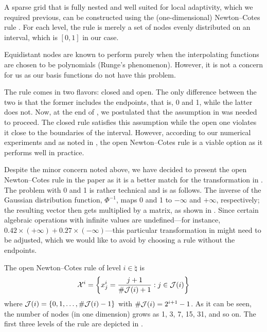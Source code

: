 A sparse grid that is fully nested and well suited for local adaptivity, which
we required previous, can be constructed using the (one-dimensional)
Newton--Cotes rule \cite{klimke2006, ma2009}. For each level, the rule is merely
a set of nodes evenly distributed on an interval, which is $[0, 1]$ in our case.

\begin{remark}
Equidistant nodes are known to perform purely when the interpolating functions
are chosen to be polynomials (Runge's phenomenon). However, it is not a concern
for us as our basis functions do not have this problem.
\end{remark}

The rule comes in two flavors: closed and open. The only difference between the
two is that the former includes the endpoints, that is, 0 and 1, while the
latter does not. Now, at the end of , we postulated that
the assumption in  was needed to proceed. The closed rule
satisfies this assumption while the open one violates it close to the boundaries
of the interval. However, according to our numerical experiments and as noted in
\cite{klimke2006}, the open Newton--Cotes rule is a viable option as it performs
well in practice.

Despite the minor concern noted above, we have decided to present the open
Newton--Cotes rule in the paper as it is a better match for the transformation
in . The problem with 0 and 1 is rather technical and is as
follows. The inverse of the Gaussian distribution function, $\Phi^{-1}$, maps 0
and 1 to $-\infty$ and $+\infty$, respectively; the resulting vector then gets
multiplied by a matrix, as shown in . Since certain
algebraic operations with infinite values are undefined---for instance, $0.42
\times (+\infty) + 0.27 \times (-\infty)$---this particular transformation in
 might need to be adjusted, which we would like to avoid by
choosing a rule without the endpoints.


The open Newton--Cotes rule of level $i \in \natural$ is
\[
  \mathcal{X}^i = \left\{ x^i_j = \frac{j + 1}{\# \mathcal{J}(i) + 1}: j \in \mathcal{J}(i) \right\}
\]
where $\mathcal{J}(i) = \left\{ 0, 1, \dots, \# \mathcal{J}(i) - 1 \right\}$
with $\# \mathcal{J}(i) = 2^{i + 1} - 1$. As it can be seen, the number of
nodes (in one dimension) grows as 1, 3, 7, 15, 31, and so on. The first three
levels of the rule are depicted in .

